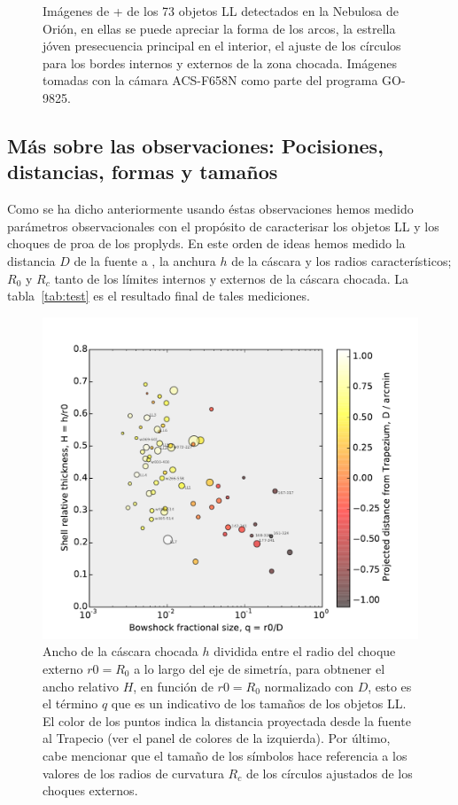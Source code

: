 \begin{figure}[htp]
\begin{tabular}{|l|l|}
\end{tabular}
  \caption{Imágenes de \ha{}+\nii{} de los 73 objetos LL detectados en la Nebulosa de Orión, en ellas se puede apreciar la forma de los arcos, la estrella jóven presecuencia principal en el interior, el ajuste de los círculos para los bordes internos y externos de la zona chocada. Imágenes tomadas con la cámara ACS-F658N como parte del programa GO-9825. }
  \label{fig:images} 
\end{figure}

\subsection{Más sobre las observaciones: Pocisiones, distancias, formas y tamaños}
\label{sec:observations}

Como se ha dicho anteriormente usando éstas observaciones  hemos medido parámetros observacionales con el propósito de caracterisar los objetos LL y los choques de proa de los proplyds. En este orden de ideas hemos medido la distancia \(D\) de la fuente a \thC{}, la anchura \(h\) de la cáscara y los radios característicos; \(R_{0}\) y \(R_{c}\) tanto de los límites internos y externos de la cáscara chocada. La tabla~\ref{tab:test} es el resultado final de tales mediciones.\\

\begin{figure}
  \centering
  \includegraphics[width=\linewidth]{luis-programas/will-H-vs-q}
  \caption{Ancho de la cáscara chocada \(h\) dividida entre el radio del choque externo \(r0 = R_{0}\) a lo largo del eje de simetría, para obtnener el ancho relativo \(H\), en función de  \(r0 = R_{0}\) normalizado con \(D\), esto es el término \(q\) que es un indicativo de los tamaños de los objetos LL. El color de los puntos indica la distancia proyectada desde la fuente al Trapecio (ver el panel de colores de la izquierda). Por último, cabe mencionar que el tamaño de los símbolos hace referencia a los valores de los radios de curvatura \(R_{c}\) de los círculos ajustados de los choques externos.}
  \label{fig:thikness}
\end{figure} 

